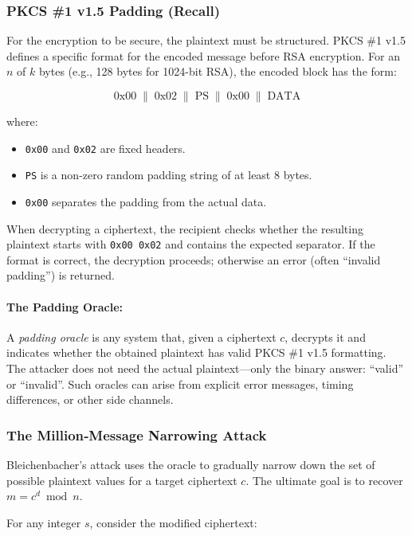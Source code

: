 \subsubsection*{PKCS \#1 v1.5 Padding (Recall)}

For the encryption to be secure, the plaintext must be structured. PKCS \#1 v1.5 defines a specific format for the encoded message before RSA encryption. For an \(n\) of \(k\) bytes (e.g., 128 bytes for 1024-bit RSA), the encoded block has the form:

\[
\text{0x00} \;\|\; \text{0x02} \;\|\; \text{PS} \;\|\; \text{0x00} \;\|\; \text{DATA}
\]

where:
\begin{itemize}
    \item \texttt{0x00} and \texttt{0x02} are fixed headers.
    \item \texttt{PS} is a non‑zero random padding string of at least 8 bytes.
    \item \texttt{0x00} separates the padding from the actual data.
\end{itemize}

When decrypting a ciphertext, the recipient checks whether the resulting plaintext starts with \texttt{0x00 0x02} and contains the expected separator. If the format is correct, the decryption proceeds; otherwise an error (often “invalid padding”) is returned.

\paragraph{The Padding Oracle: }

A \emph{padding oracle} is any system that, given a ciphertext \(c\), decrypts it and indicates whether the obtained plaintext has valid PKCS \#1 v1.5 formatting. The attacker does not need the actual plaintext—only the binary answer: “valid” or “invalid”. Such oracles can arise from explicit error messages, timing differences, or other side channels.

\subsubsection*{The Million‑Message Narrowing Attack}

Bleichenbacher's attack uses the oracle to gradually narrow down the set of possible plaintext values for a target ciphertext \(c\). The ultimate goal is to recover \(m = c^d \bmod n\).

For any integer \(s\), consider the modified ciphertext:

